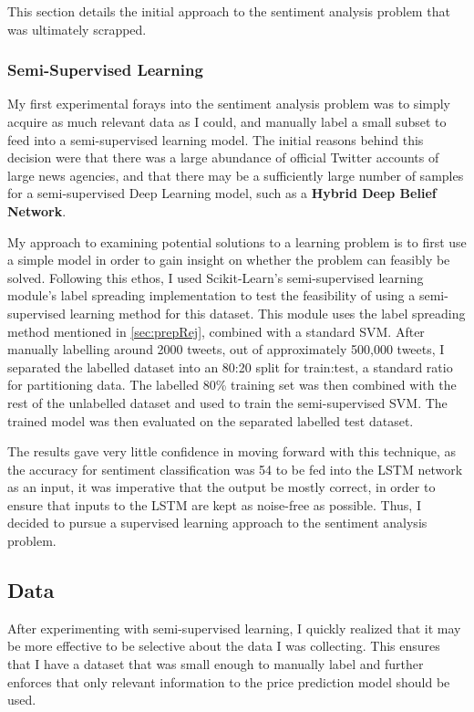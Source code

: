 \documentclass[12pt,a4paper,twoside,openright]{report}
\begin{document}
This section details the initial approach to the sentiment analysis problem
that was ultimately scrapped.

\subsubsection{Semi-Supervised Learning}
\label{sec:semi}
My first experimental forays into the sentiment analysis problem was to
simply acquire as much relevant data as I could, and manually label a small subset
to feed into a semi-supervised learning model. The initial reasons behind this decision
were that there was a large abundance of official Twitter accounts of large news
agencies, and that there may be a sufficiently large number of samples for a
semi-supervised Deep Learning model, such as a \textbf{Hybrid Deep Belief Network}\cite{Zhou14}.

My approach to examining potential solutions to a learning problem is to first
use a simple model in order to gain insight on whether the problem can feasibly
be solved. Following this ethos, I used Scikit-Learn's semi-supervised learning module's
label spreading implementation to test the feasibility of using a semi-supervised learning
method for this dataset. This module uses the label spreading method mentioned in
\cref{sec:prepRej}, combined with a standard SVM.
After manually labelling around 2000 tweets, out of
approximately 500,000 tweets, I separated the labelled dataset into an 80:20 split for train:test,
a standard ratio for partitioning data. The labelled 80\% training set was then combined
with the rest of the unlabelled dataset and used to train the semi-supervised SVM. The
trained model was then evaluated on the separated labelled test dataset. 

The results gave very little confidence in moving forward with this technique, as the accuracy 
for sentiment classification was 54%
to be fed into the LSTM network as an input, it was imperative that the output be mostly correct,
in order to ensure that inputs to the LSTM are kept as noise-free as possible. Thus, I decided to
pursue a supervised learning approach to the sentiment analysis problem.

\subsection{Data}
\label{sec:impSentiData}

After experimenting with semi-supervised learning, I quickly realized
that it may be more effective to be selective about the data I was collecting. This ensures
that I have a dataset that was small enough to manually label and further enforces that only relevant 
information to the price prediction model should be used. 
\end{document}

